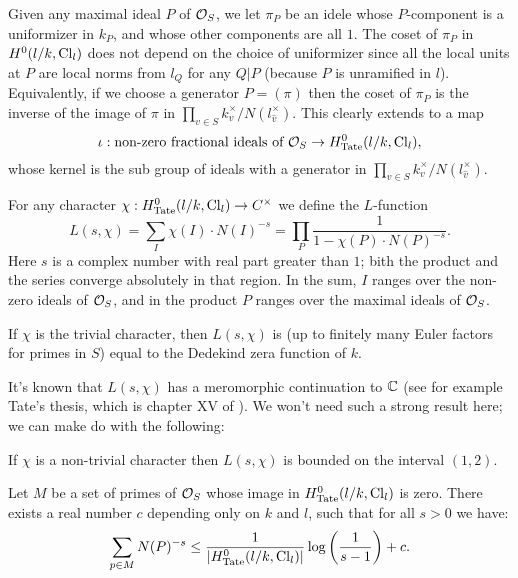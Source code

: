 Given any maximal ideal $P$ of ${\mathcal O}_S$, we let $\pi_P$ be an idele whose
$P$-component is a uniformizer in $k_P$, and whose other components are all $1$.
The coset of $\pi_P$ in $H^0(l/k,\mathrm{Cl}_l)$ does not depend on the choice of uniformizer since
all the local units at $P$ are local norms from $l_{Q}$ for any $Q|P$
(because $P$ is unramified in $l$).
Equivalently, if we choose a generator $P=(\pi)$ then the coset of $\pi_P$ is the inverse of
the image of $\pi$ in $\prod_{v \in S} k_v^\times / N(l_{\hat v}^\times)$.
This clearly extends to a map
\[
	\iota : \textrm{non-zero fractional ideals of ${\mathcal O}_S$}
	\to
	H^0_{\mathrm{Tate}}(l/k,\mathrm{Cl}_l),
\]
whose kernel is the sub group of ideals with a generator in
$\prod_{v \in S} k_v^\times / N(l_{\hat v}^\times)$.

\begin{definition}
	For any character $\chi : H^0_{\mathrm{Tate}}(l/k,\mathrm{Cl}_l) \to C^\times$ we define the $L$-function
	\[
		L(s,\chi)
		=
		\sum_{I} \chi(I) \cdot N(I)^{-s}
		=
		\prod_{P} \frac{1}{1-\chi(P) \cdot N(P)^{-s}}.
	\]
	Here $s$ is a complex number with real part greater than $1$; bith the product and the series
	converge absolutely in that region.
	In the sum, $I$ ranges over the non-zero ideals of ${\mathcal O}_S$, and in the product $P$
	ranges over the maximal ideals of ${\mathcal O}_S$.

	If $\chi$ is the trivial character, then $L(s,\chi)$ is
	(up to finitely many Euler factors for primes in $S$)
	equal to the Dedekind zera function of $k$.
\end{definition}


It's known that $L(s,\chi)$ has a meromorphic continuation to ${\mathbb C}$
(see for example Tate's thesis, which is chapter XV of \cite{cassells frohlich}).
We won't need such a strong result here; we can make do with the following:

\begin{lemma}
	If $\chi$ is a non-trivial character then $L(s,\chi)$ is
	bounded on the interval $(1,2)$.
\end{lemma}



\begin{lemma}
	Let $M$ be a set of primes of ${\mathcal O}_S$ whose image in $H^0_{\mathrm{Tate}}(l/k,\mathrm{Cl}_l)$ is zero.
	There exists a real number $c$ depending only on $k$ and $l$,
	such that for all $s > 0$ we have:
	\[
		\sum_{p \in M} N(P)^{-s}
		\le \frac{1}{|H^0_{\mathrm{Tate}}(l/k,\mathrm{Cl}_l)|} \log\left(\frac{1}{s-1}\right) + c.
	\]
\end{lemma}



